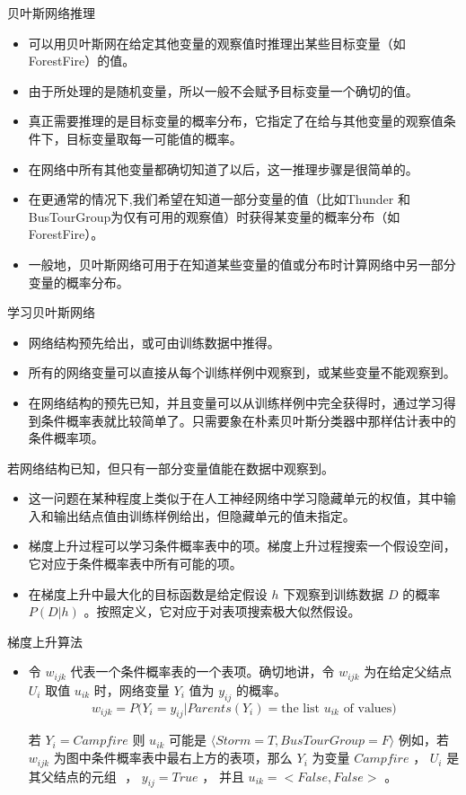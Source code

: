 \documentclass[presentation]{beamer}
\begin{document}
\begin{frame}[label={sec:orgab2eb46}]{贝叶斯网络推理}
\begin{itemize}
\item 可以用贝叶斯网在给定其他变量的观察值时推理出某些目标变量（如ForestFire）的值。
\item 由于所处理的是随机变量，所以一般不会赋予目标变量一个确切的值。
\item 真正需要推理的是目标变量的概率分布，它指定了在给与其他变量的观察值条件下，目标变量取每一可能值的概率。
\item 在网络中所有其他变量都确切知道了以后，这一推理步骤是很简单的。
\item 在更通常的情况下,我们希望在知道一部分变量的值（比如Thunder 和BusTourGroup为仅有可用的观察值）时获得某变量的概率分布（如ForestFire）。
\item 一般地，贝叶斯网络可用于在知道某些变量的值或分布时计算网络中另一部分变量的概率分布。
\end{itemize}
\end{frame}

\begin{frame}[label={sec:org436ea41}]{学习贝叶斯网络}
\begin{itemize}
\item 网络结构预先给出，或可由训练数据中推得。
\item 所有的网络变量可以直接从每个训练样例中观察到，或某些变量不能观察到。
\item 在网络结构的预先已知，并且变量可以从训练样例中完全获得时，通过学习得到条件概率表就比较简单了。只需要象在朴素贝叶斯分类器中那样估计表中的条件概率项。
\end{itemize}

若网络结构已知，但只有一部分变量值能在数据中观察到。
\begin{itemize}
\item 这一问题在某种程度上类似于在人工神经网络中学习隐藏单元的权值，其中输入和输出结点值由训练样例给出，但隐藏单元的值未指定。
\item 梯度上升过程可以学习条件概率表中的项。梯度上升过程搜索一个假设空间，它对应于条件概率表中所有可能的项。
\item 在梯度上升中最大化的目标函数是给定假设 \(h\) 下观察到训练数据 \(D\) 的概率 \(P(D|h)\) 。按照定义，它对应于对表项搜索极大似然假设。
\end{itemize}
\end{frame}

\begin{frame}[label={sec:orgc83030e}]{梯度上升算法}
\begin{itemize}
\item 令 \(w_{ijk}\) 代表一个条件概率表的一个表项。确切地讲，令 \(w_{ijk}\)  为在给定父结点 \(U_i\) 取值 \(u_{ik}\) 时，网络变量 \(Y_i\) 值为 \(y_{ij}\) 的概率。
$$w_{ijk} = P(Y_i=y_{ij} | Parents(Y_i) = \mbox{the list $u_{ik}$ of values)}$$

若  \(Y_i = Campfire\) 则 \(u_{ik}\) 可能是 \(\langle Storm=T, BusTourGroup=F \rangle\)
例如，若 \(w_{ijk}\) 为图中条件概率表中最右上方的表项，那么 \(Y_i\) 为变量 \(Campfire\) ， 
\(U_i\) 是其父结点的元组 \(<Storm, BusTourGroup>\) ， \(y_{ij}=True\) ， 并且 \(u_{ik}=<False, False>\) 。
\end{itemize}
\end{frame}
\end{document}
